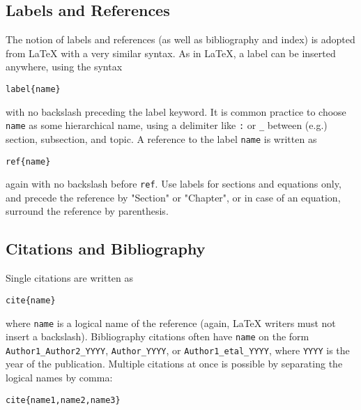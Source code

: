 \documentclass[%
oneside,                 %
final,                   %
10pt]{article}
\begin{document}
\subsection{Labels and References}
The notion of labels and references (as well as bibliography and index)
is adopted
from {\LaTeX} with a very similar syntax. As in {\LaTeX}, a label can be
inserted anywhere, using the syntax
\begin{Verbatim}[numbers=none,fontsize=\fontsize{9pt}{9pt},baselinestretch=0.95,xleftmargin=2mm]
label{name}

\end{Verbatim}

with no backslash
preceding the label keyword. It is common practice to choose \texttt{name}
as some hierarchical name, using a delimiter like \texttt{:} or \Verb!_! between
(e.g.) section, subsection, and topic.
A reference to the label \texttt{name} is written as
\begin{Verbatim}[numbers=none,fontsize=\fontsize{9pt}{9pt},baselinestretch=0.95,xleftmargin=2mm]
ref{name}

\end{Verbatim}

again with no backslash before \texttt{ref}.
Use labels for sections and equations only, and precede the reference
by "Section" or "Chapter", or in case of an equation, surround the
reference by parenthesis.
\subsection{Citations and Bibliography}
Single citations are written as
\begin{Verbatim}[numbers=none,fontsize=\fontsize{9pt}{9pt},baselinestretch=0.95,xleftmargin=2mm]
cite{name}

\end{Verbatim}

where \texttt{name} is a logical name
of the reference (again, {\LaTeX} writers must not insert a backslash).
Bibliography citations often have \texttt{name} on the form
\Verb!Author1_Author2_YYYY!, \Verb!Author_YYYY!, or \Verb!Author1_etal_YYYY!, where
\texttt{YYYY} is the year of the publication.
Multiple citations at once is possible by separating the logical names
by comma:
\begin{Verbatim}[numbers=none,fontsize=\fontsize{9pt}{9pt},baselinestretch=0.95,xleftmargin=2mm]
cite{name1,name2,name3}

\end{Verbatim}
\end{document}
